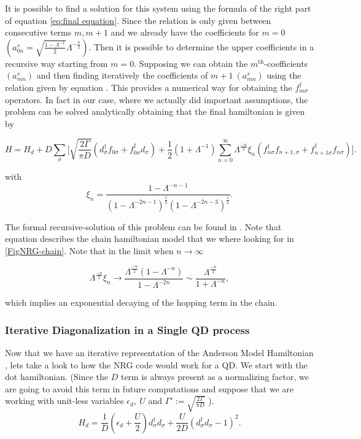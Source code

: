 It is possible to find a solution for this system using the formula of
the right part of equation \ref{eq:final equation}. Since the relation
is only given between consecutive terms $m,m+1$ and we already have
the coefficients for $m=0$ $\left(a_{0n}^{s}=\sqrt{\frac{1-\Lambda^{-1}}{2}}\Lambda^{-\frac{n}{2}}\right).$
Then it is possible to determine the upper coefficients in a recursive way starting
from $m=0$. Supposing we can obtain the $m^{\mbox{th}}$-coefficients
$(a_{mn}^{s})$ and then finding iteratively the coefficients of $m+1\ (a_{mn}^{s})$
using the relation given by equation .
This provides a numerical way for obtaining the $f_{m\sigma}^{\dagger}$
operators. In fact in our case, where we actually did important assumptions,
the problem can be solved analytically obtaining that the final hamiltonian
is given by 

\begin{equation}
H=H_{d}+D\sum_{\sigma}\Biggl[\sqrt{\frac{2\Gamma}{\pi D}}\left(d_{\sigma}^{\dagger}f_{0\sigma}+f_{0\sigma}^{\dagger}d_{\sigma}\right)+\frac{1}{2}\left(1+\Lambda^{-1}\right)\sum_{n=0}^{\infty}\Lambda^{\frac{-n}{2}}\xi_{n}\left(f_{n\sigma}^{\dagger}f_{n+1,\sigma}+f_{n+1\sigma}^{\dagger}f_{n\sigma}\right)\Biggr].\label{eq:chain-Hamiltonian}
\end{equation}


with 
\[
\xi_{n}=\frac{1-\Lambda^{-n-1}}{\left(1-\Lambda^{-2n-1}\right)^{\frac{1}{2}}\left(1-\Lambda^{-2n-3}\right)^{\frac{1}{2}}}.
\]


The formal recursive-solution of this problem can be found in \citep{bulla_numerical_2008}
. Note that equation  describes the
chain hamiltonian model that we where looking for in \ref{FigNRG-chain}.
Note that in the limit when $n\longrightarrow\infty$ 

\[
\Lambda^{\frac{-n}{2}}\xi_{n}\longrightarrow\frac{\Lambda^{\frac{-n}{2}}\left(1-\Lambda^{-n}\right)}{1-\Lambda^{-2n}}\sim\frac{\Lambda^{\frac{-n}{2}}}{1+\Lambda^{-n}},
\]


which implies an exponential decaying of the hopping term in the chain. 

\subsubsection{Iterative Diagonalization in a Single QD process}

Now that we have an iterative representation of the Anderson Model
Hamiltonian , lets take a look to
how the NRG code would work for a QD. We start with the dot hamiltonian.
(Since the $D$ term is always present as a normalizing factor, we
are going to avoid this term in future computations and suppose that
we are working with unit-less variables $\epsilon_{d},\ U$ and $\Gamma':=\sqrt{\frac{2\Gamma}{\pi D}}$
).
\begin{equation}
H_{d}=\frac{1}{D}\left(\epsilon_{d}+\frac{U}{2}\right)d_{\sigma}^{\dagger}d_{\sigma}+\frac{U}{2D}(d_{\sigma}^{\dagger}d_{\sigma}-1)^{2}.\label{eq:DotHam}
\end{equation}


